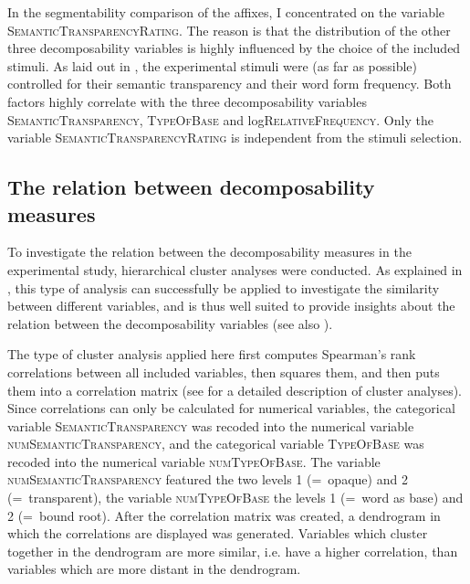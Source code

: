 In the segmentability comparison of the affixes, I concentrated on the variable \textsc{SemanticTransparencyRating}. The reason is that the distribution of the other three decomposability variables is highly influenced by the choice of the included stimuli. 
 As laid out in , the experimental stimuli were (as far as possible) controlled for their semantic transparency  and their word form frequency. Both factors highly correlate with the three decomposability variables  \textsc{SemanticTransparency}, \textsc{TypeOfBase} and log\textsc{RelativeFrequency}. 
 Only the variable \textsc{SemanticTransparencyRating} is independent from the stimuli selection.



\subsection{The relation between decomposability measures}

To investigate the relation between the decomposability measures in the experimental study, hierarchical cluster analyses were conducted. As  explained in , this type of analysis can successfully be applied to investigate the similarity between different variables, and is thus well suited to provide insights about the relation between the decomposability variables (see also \citealt[200 f.]{Baayen.2008}). 

The type of cluster analysis applied here first computes Spearman's rank correlations between all included variables, then squares them, and then puts them into a correlation matrix  (see  for a detailed description of cluster analyses). 
Since correlations can only be calculated for numerical variables, 
the categorical variable \textsc{SemanticTransparency}  was recoded into the numerical variable \textsc{numSemanticTransparency}, and the categorical variable \textsc{TypeOfBase} was recoded into the numerical variable \textsc{numTypeOfBase}.  The variable \textsc{numSemanticTransparency} featured  the two levels 1 (=~opaque) and 2 (=~transparent), the variable \textsc{numTypeOfBase} the levels 1 (=~word as base) and 2 (=~bound root). After the correlation matrix was created,  a dendrogram in which the correlations are displayed was generated. Variables which cluster together in the dendrogram are more similar, i.e. have a higher correlation, than variables which are more distant in the dendrogram. 


